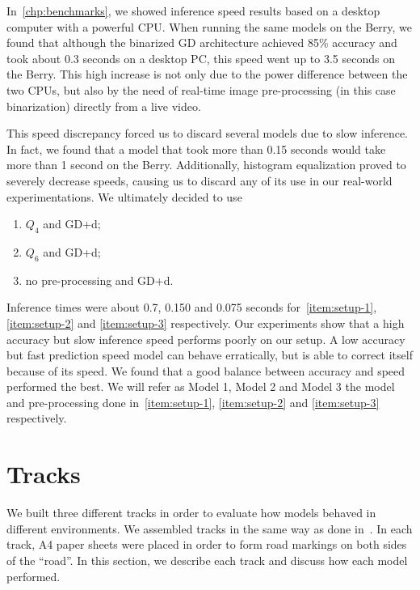 In~\autoref{chp:benchmarks}, we showed inference speed results based on a desktop computer with a
powerful CPU. When running the same models on the Berry, we found that although the binarized GD
architecture achieved 85\% accuracy and took about 0.3 seconds on a desktop PC, this speed went up
to 3.5 seconds on the Berry. This high increase is not only due to the power difference between the
two CPUs, but also by the need of real-time image pre-processing (in this case binarization)
directly from a live video.

This speed discrepancy forced us to discard several models due to slow inference. In fact, we found
that a model that took more than 0.15 seconds would take more than 1 second on the Berry.
Additionally, histogram equalization proved to severely decrease speeds, causing us to discard any
of its use in our real-world experimentations. We ultimately decided to use

\begin{enumerate}
  \item\label{item:setup-1} $Q_4$ and GD+d;
  \item\label{item:setup-2} $Q_6$ and GD+d;
  \item\label{item:setup-3} no pre-processing and GD+d.
\end{enumerate}

Inference times were about 0.7, 0.150 and 0.075 seconds for~\autoref{item:setup-1},
\autoref{item:setup-2} and \autoref{item:setup-3} respectively. Our experiments show that a high
accuracy but slow inference speed performs poorly on our setup. A low accuracy but fast prediction
speed model can behave erratically, but is able to correct itself because of its speed. We found
that a good balance between accuracy and speed performed the best. We will refer as Model 1, Model
2 and Model 3 the model and pre-processing done in~\autoref{item:setup-1}, \autoref{item:setup-2}
and \autoref{item:setup-3} respectively.

\section{Tracks}

We built three different tracks in order to evaluate how models behaved in different environments.
We assembled tracks in the same way as done in~\cite{self-driving}. In each track, A4 paper sheets
were placed in order to form road markings on both sides of the ``road''. In this section, we
describe each track and discuss how each model performed.

